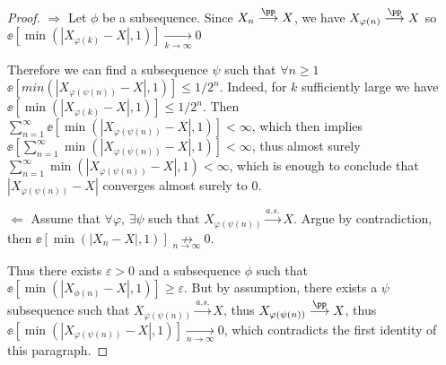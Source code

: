 \documentclass[../main.tex]{subfiles}
\begin{document}
   \begin{proof}
      $\boxed{\Rightarrow}$ Let $\phi$ be a subsequence. Since $X_n
      \overset{\pp}{\longrightarrow} X$, we have $X_{\varphi(n)}
      \overset{\pp}{\longrightarrow} X$ so $\ee[\min(|X_{\varphi(k)} - X|, 1)]
      \underset{k \to \infty}{\longrightarrow} 0$

      \vspace{0.3em}

      \noindent
      Therefore we can find a subsequence $\psi$ such that $\forall n \geq 1$
      $\ee[min(|X_{\varphi(\psi(n))} - X|, 1)] \leq 1/2^n$. 
      Indeed, for $k$ sufficiently large we have $\ee[\min(|X_{\varphi(k)} - X|
      , 1)] \leq 1/2^n$. Then $\sum_{n=1}^\infty
      \ee[\min(|X_{\varphi(\psi(n))} - X|, 1)] < \infty$, which then implies
      $\ee[\sum_{n=1}^\infty
      \min(|X_{\varphi(\psi(n))} - X|, 1)] < \infty$, thus almost surely
      $\sum_{n=1}^\infty \min(|X_{\varphi(\psi(n))} -X|, 1) < \infty$, which
      is enough to conclude that $|X_{\varphi(\psi(n))} -X|$ 
      converges almost surely to $0$.

      \vspace{1em}
      \noindent
      $\boxed{\Leftarrow}$ Assume that $\forall \varphi$, $\exists \psi$ such
      that $X_{\varphi(\psi(n))} \overset{a.s.}{\longrightarrow} X$. Argue by
      contradiction, then $\ee[\min(|X_n - X|, 1)] \underset{n \to
      \infty}{\not\rightarrow}0$.

      \vspace{0.3em}
      \noindent

      Thus there exists $\varepsilon>0$ and a subsequence $\phi$ such that
      $\ee[\min(|X_{\phi(n)} - X|, 1)] \geq \varepsilon$. But by assumption,
      there exists a $\psi$ subsequence such that $X_{\varphi(\psi(n))}
      \overset{a.s.}{\longrightarrow} X$, thus $X_{\varphi(\psi(n))}
      \overset{\pp}{\longrightarrow} X$, thus $\ee[\min(|X_{\varphi(\psi(n))}
      - X|, 1)] \underset{n \to \infty}{\longrightarrow} 0$, which contradicts
      the first identity of this paragraph.
   \end{proof}
\end{document}

